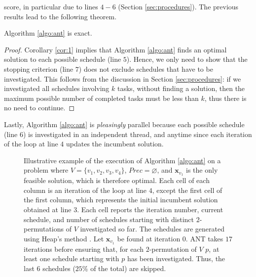 score, in particular due to lines $4 - 6$ (Section \ref{sec:procedures}). The previous
results lead to the following theorem.
\begin{theorem}\label{teo:exactness}
    Algorithm \ref{algo:ant} is exact.
\end{theorem}
\begin{proof}
Corollary \ref{cor:1} implies that Algorithm \ref{algo:ant} finds an optimal solution to
each possible schedule (line $5$). Hence, we only need to show that the stopping criterion
(line $7$) does not exclude schedules that have to be investigated. This follows from the
discussion in Section \ref{sec:procedures}: if we investigated all schedules involving $k$
tasks, without finding a solution, then the maximum possible number of completed tasks
must be less than $k$, thus there is no need to continue.
\end{proof}
Lastly, Algorithm \ref{algo:ant} is \emph{pleasingly} parallel \cite[Section
$2.1$]{kepner2009} because each possible schedule (line $6$) is investigated in an
independent thread, and anytime since each iteration of the loop at line $4$ updates the
incumbent solution.

\begin{figure}[t]
    \centering
    \begin{adjustbox}{width=.825\textwidth}
        
    \end{adjustbox}
    \caption[Illustrative example of the execution of ANT]{%
        Illustrative example of the execution of Algorithm \ref{algo:ant} on a problem
        where $V = \{ v_1, v_2, v_3, v_4 \}$, $Prec = \varnothing$, and $\bm{x}_{v_1}$ is
        the only feasible solution, which is therefore optimal. Each cell of each column
        is an iteration of the loop at line $4$, except the first cell of the first
        column, which represents the initial incumbent solution obtained at line $3$. Each
        cell reports the iteration number, current schedule, and number of schedules
        starting with distinct $2$-permutations of $V$ investigated so far. The schedules
        are generated using Heap's method \cite{sedgewick1977}. Let $\bm{x}_{v_1}$ be
        found at iteration $0$. ANT takes $17$ iterations before ensuring that, for each
        $2$-permutation of $V$ $p$, at least one schedule starting with $p$ has been
        investigated. Thus, the last $6$ schedules ($25\%$ of the total) are skipped.}
    \label{fig:ant-ex}
\end{figure}

